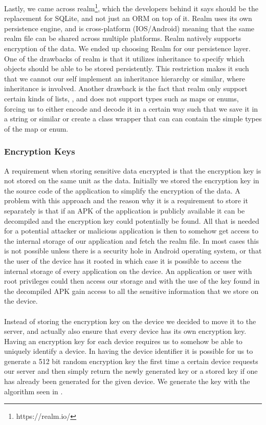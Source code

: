 Lastly, we came across realm\footnote{https://realm.io/}, which the developers behind it says should be the replacement for SQLite, and not just an ORM on top of it. Realm uses its own persistence engine, and is cross-platform (IOS/Android) meaning that the same realm file can be shared across multiple platforms. Realm natively supports encryption of the data. We ended up choosing Realm for our persistence layer. One of the drawbacks of realm is that it utilizes inheritance to specify which objects should be able to be stored persistently. This restriction makes it such that we cannot our self implement an inheritance hierarchy or similar, where inheritance is involved. Another drawback is the fact that realm only support certain kinds of lists, , and does not support types such as maps or enums, forcing us to either encode and decode it in a certain way such that we save it in a string or similar or create a class wrapper that can can contain the simple types of the map or enum.


\subsubsection{Encryption Keys}
\label{sub:encryption_keys}
A requirement when storing sensitive data encrypted is that the encryption key is not stored on the same unit as the data. Initially we stored the encryption key in the source code of the application to simplify the encryption of the data. A problem with this approach and the reason why it is a requirement to store it separately is that if an APK of the application is publicly available it can be decompiled and the encryption key could potentially be found. All that is needed for a potential attacker or malicious application is then to somehow get access to the internal storage of our application and fetch the realm file. In most cases this is not possible unless there is a security hole in Android operating system, or that the user of the device has it rooted in which case it is possible to access the internal storage of every application on the device. An application or user with root privileges could then access our storage and with the use of the key found in the decompiled APK gain access to all the sensitive information that we store on the device.
\\\\
Instead of storing the encryption key on the device we decided to move it to the server, and actually also ensure that every device has its own encryption key. Having an encryption key for each device requires us to somehow be able to uniquely identify a device. 
In having the device identifier it is possible for us to generate a 512 bit random encryption key the first time a certain device requests our server and then simply return the newly generated key or a stored key if one has already been generated for the given device. We generate the key with the algorithm seen in . 

